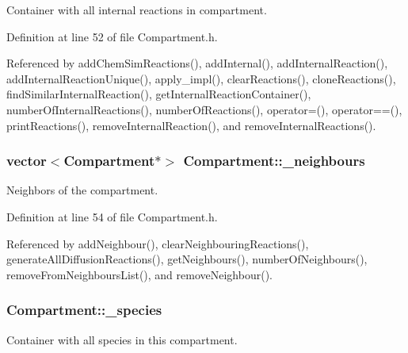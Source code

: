 Container with all internal reactions in compartment. 



Definition at line 52 of file Compartment.\+h.



Referenced by add\+Chem\+Sim\+Reactions(), add\+Internal(), add\+Internal\+Reaction(), add\+Internal\+Reaction\+Unique(), apply\+\_\+impl(), clear\+Reactions(), clone\+Reactions(), find\+Similar\+Internal\+Reaction(), get\+Internal\+Reaction\+Container(), number\+Of\+Internal\+Reactions(), number\+Of\+Reactions(), operator=(), operator==(), print\+Reactions(), remove\+Internal\+Reaction(), and remove\+Internal\+Reactions().

\hypertarget{classCompartment_aef4d7ce0676c4ddb03fa02b90973c41c}{
\subsubsection[{\+\_\+neighbours}]{\setlength{\rightskip}{0pt plus 5cm}vector$<${\bf Compartment}$\ast$$>$ Compartment\+::\+\_\+neighbours\hspace{0.3cm}{\ttfamily [protected]}}}\label{classCompartment_aef4d7ce0676c4ddb03fa02b90973c41c}


Neighbors of the compartment. 



Definition at line 54 of file Compartment.\+h.



Referenced by add\+Neighbour(), clear\+Neighbouring\+Reactions(), generate\+All\+Diffusion\+Reactions(), get\+Neighbours(), number\+Of\+Neighbours(), remove\+From\+Neighbours\+List(), and remove\+Neighbour().

\hypertarget{classCompartment_a95e7acd5a3b639050b25fb3b84a96689}{
\subsubsection[{\+\_\+species}]{ Compartment\+::\+\_\+species\hspace{0.3cm}{\ttfamily [protected]}}}\label{classCompartment_a95e7acd5a3b639050b25fb3b84a96689}


Container with all species in this compartment. 



